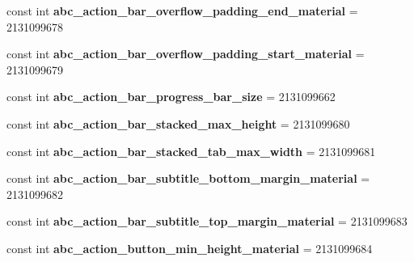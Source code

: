 \begin{DoxyCompactItemize}
const int {\bfseries abc\+\_\+action\+\_\+bar\+\_\+overflow\+\_\+padding\+\_\+end\+\_\+material} = 2131099678
\item 
\mbox{\label{class_sample_app_1_1_droid_1_1_resource_1_1_dimension_adf4dd642c0acd5ba2652ead3994e8509}} 
const int {\bfseries abc\+\_\+action\+\_\+bar\+\_\+overflow\+\_\+padding\+\_\+start\+\_\+material} = 2131099679
\item 
\mbox{\label{class_sample_app_1_1_droid_1_1_resource_1_1_dimension_af70f01a75c8a480f1863c7193fd3a191}} 
const int {\bfseries abc\+\_\+action\+\_\+bar\+\_\+progress\+\_\+bar\+\_\+size} = 2131099662
\item 
\mbox{\label{class_sample_app_1_1_droid_1_1_resource_1_1_dimension_af35cf8a384efa027ffced33b1ea55e6f}} 
const int {\bfseries abc\+\_\+action\+\_\+bar\+\_\+stacked\+\_\+max\+\_\+height} = 2131099680
\item 
\mbox{\label{class_sample_app_1_1_droid_1_1_resource_1_1_dimension_a7b10d13f14c266ca65089cdc7fb9fe42}} 
const int {\bfseries abc\+\_\+action\+\_\+bar\+\_\+stacked\+\_\+tab\+\_\+max\+\_\+width} = 2131099681
\item 
\mbox{\label{class_sample_app_1_1_droid_1_1_resource_1_1_dimension_a2f120a6f82bd475cf2fdb461f60e5efc}} 
const int {\bfseries abc\+\_\+action\+\_\+bar\+\_\+subtitle\+\_\+bottom\+\_\+margin\+\_\+material} = 2131099682
\item 
\mbox{\label{class_sample_app_1_1_droid_1_1_resource_1_1_dimension_a6702c22c89abfd647b33e2826a8bd55f}} 
const int {\bfseries abc\+\_\+action\+\_\+bar\+\_\+subtitle\+\_\+top\+\_\+margin\+\_\+material} = 2131099683
\item 
\mbox{\label{class_sample_app_1_1_droid_1_1_resource_1_1_dimension_a89fbc0d569c718607d02e104a9918038}} 
const int {\bfseries abc\+\_\+action\+\_\+button\+\_\+min\+\_\+height\+\_\+material} = 2131099684
\item 

\end{DoxyCompactItemize}
